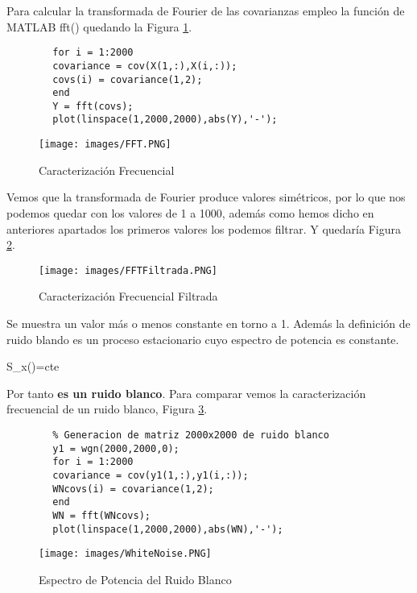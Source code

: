 \documentclass[a4paper, fontsize=11pt]{scrartcl} %
\numberwithin{equation}{section} %
\numberwithin{figure}{section} %
\numberwithin{table}{section} %
\newenvironment{myalign}{\par\nobreak\large\noindent\align}{\endalign} %
\begin{document}
	Para calcular la transformada de Fourier de las covarianzas empleo la función de MATLAB fft() quedando la Figura \ref{Caracterización Frecuencial}.
	
	\begin{lstlisting}
		for i = 1:2000
		covariance = cov(X(1,:),X(i,:));
		covs(i) = covariance(1,2);
		end
		Y = fft(covs);
		plot(linspace(1,2000,2000),abs(Y),'-');
	\end{lstlisting} 
	
	\begin{figure}[h!]
		\centering
		\texttt{[image: images/FFT.PNG]}
		\caption{Caracterización Frecuencial}
		\label{Caracterización Frecuencial}
	\end{figure}
	\FloatBarrier
	
	Vemos que la transformada de Fourier produce valores simétricos, por lo que nos podemos quedar con los valores de 1 a 1000, además como hemos dicho en anteriores apartados los primeros valores los podemos filtrar. Y quedaría Figura \ref{Caracterización Frecuencial Filtrada}.
	
	\begin{figure}[h!]
		\centering
		\texttt{[image: images/FFTFiltrada.PNG]}
		\caption{Caracterización Frecuencial Filtrada}
		\label{Caracterización Frecuencial Filtrada}
	\end{figure}
	\FloatBarrier
	
    Se muestra un valor más o menos constante en torno a 1. Además la definición de ruido blando es un proceso estacionario cuyo espectro de potencia es constante.
    
    \begin{myalign}
    	S_x(\omega)=cte
    \end{myalign}
    
    Por tanto \textbf{es un ruido blanco}. Para comparar vemos la caracterización frecuencial de un ruido blanco, Figura \ref{Espectro de Potencia del Ruido Blanco}.
	
	\begin{lstlisting}
		% Generacion de matriz 2000x2000 de ruido blanco
		y1 = wgn(2000,2000,0);
		for i = 1:2000
		covariance = cov(y1(1,:),y1(i,:));
		WNcovs(i) = covariance(1,2);
		end
		WN = fft(WNcovs);
		plot(linspace(1,2000,2000),abs(WN),'-');		
	\end{lstlisting}	
	
	\begin{figure}[h!]
		\centering
		\texttt{[image: images/WhiteNoise.PNG]}
		\caption{Espectro de Potencia del Ruido Blanco}
		\label{Espectro de Potencia del Ruido Blanco}
	\end{figure}
	\FloatBarrier
	
\end{document}
